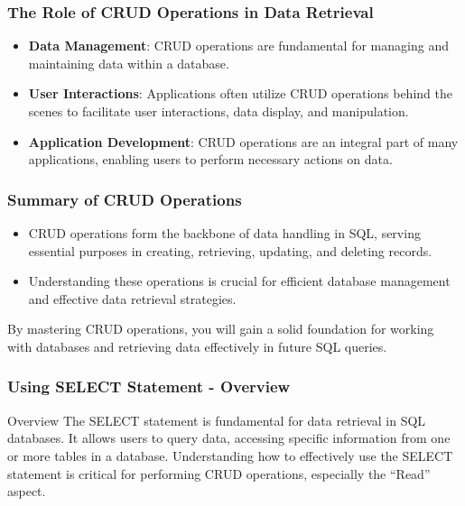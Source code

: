 \documentclass[aspectratio=169]{beamer}
\begin{document}
\begin{frame}[fragile]
  \frametitle{The Role of CRUD Operations in Data Retrieval}
  \begin{itemize}
    \item \textbf{Data Management}: CRUD operations are fundamental for managing and maintaining data within a database.
    \item \textbf{User Interactions}: Applications often utilize CRUD operations behind the scenes to facilitate user interactions, data display, and manipulation.
    \item \textbf{Application Development}: CRUD operations are an integral part of many applications, enabling users to perform necessary actions on data.
  \end{itemize}
\end{frame}

\begin{frame}[fragile]
  \frametitle{Summary of CRUD Operations}
  \begin{itemize}
    \item CRUD operations form the backbone of data handling in SQL, serving essential purposes in creating, retrieving, updating, and deleting records.
    \item Understanding these operations is crucial for efficient database management and effective data retrieval strategies.
  \end{itemize}
  
  By mastering CRUD operations, you will gain a solid foundation for working with databases and retrieving data effectively in future SQL queries.
\end{frame}

\begin{frame}[fragile]
    \frametitle{Using SELECT Statement - Overview}
    \begin{block}{Overview}
        The SELECT statement is fundamental for data retrieval in SQL databases. 
        It allows users to query data, accessing specific information from one or 
        more tables in a database. Understanding how to effectively use the 
        SELECT statement is critical for performing CRUD operations, especially 
        the ``Read'' aspect.
    \end{block}
\end{frame}
\end{document}
